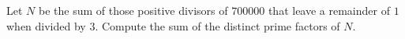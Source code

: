 Let $N$ be the sum of those positive divisors of $700000$ that leave a remainder of $1$ when divided by $3$. Compute the sum of the distinct prime factors of $N$.
